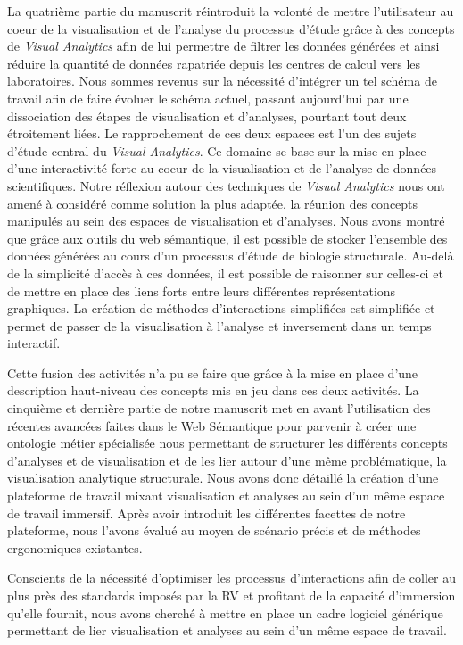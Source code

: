 La quatrième partie du manuscrit réintroduit la volonté de mettre l'utilisateur au coeur de la visualisation et de l'analyse du processus d'étude grâce à des concepts de \textit{Visual Analytics} afin de lui permettre de filtrer les données générées et ainsi réduire la quantité de données rapatriée depuis les centres de calcul vers les laboratoires. Nous sommes revenus sur la nécessité d'intégrer un tel schéma de travail afin de faire évoluer le schéma actuel, passant aujourd'hui par une dissociation des étapes de visualisation et d'analyses, pourtant tout deux étroitement liées.
Le rapprochement de ces deux espaces est l'un des sujets d'étude central du \textit{Visual Analytics}. Ce domaine se base sur la mise en place d'une interactivité forte au coeur de la visualisation et de l'analyse de données scientifiques. Notre réflexion autour des techniques de \textit{Visual Analytics} nous ont amené à considéré comme solution la plus adaptée, la réunion des concepts manipulés au sein des espaces de visualisation et d'analyses.
Nous avons montré que grâce aux outils du web sémantique, il est possible de stocker l'ensemble des données générées au cours d'un processus d'étude de biologie structurale. Au-delà de la simplicité d'accès à ces données, il est possible de raisonner sur celles-ci et de mettre en place des liens forts entre leurs différentes représentations graphiques. La création de méthodes d'interactions simplifiées est simplifiée et permet de passer de la visualisation à l'analyse et inversement dans un temps interactif.

Cette fusion des activités n'a pu se faire que grâce à la mise en place d'une description haut-niveau des concepts mis en jeu dans ces deux activités. La cinquième et dernière partie de notre manuscrit met en avant l'utilisation des récentes avancées faites dans le Web Sémantique pour parvenir à créer une ontologie métier spécialisée nous permettant de structurer les différents concepts d'analyses et de visualisation et de les lier autour d'une même problématique, la visualisation analytique structurale.
Nous avons donc détaillé la création d'une plateforme de travail mixant visualisation et analyses au sein d'un même espace de travail immersif. Après avoir introduit les différentes facettes de notre plateforme, nous l'avons évalué au moyen de scénario précis et de méthodes ergonomiques existantes.

Conscients de la nécessité d'optimiser les processus d'interactions afin de coller au plus près des standards imposés par la RV et profitant de la capacité d'immersion qu'elle fournit, nous avons cherché à mettre en place un cadre logiciel générique permettant de lier visualisation et analyses au sein d'un même espace de travail.


